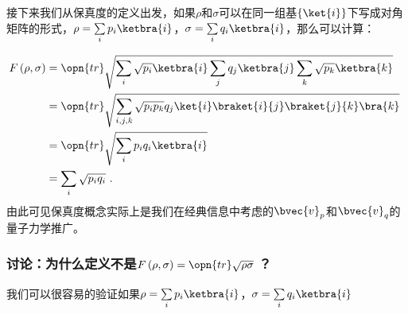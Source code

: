 接下来我们从保真度的定义出发，如果$\rho$和$\sigma$可以在同一组基$\left\{\ket{i}\right\}$下写成对角矩阵的形式，$\rho = \sum\limits_ip_i\ketbra{i}$，$\sigma = \sum\limits_iq_i\ketbra{i}$，那么可以计算：

\begin{equation}
\begin{aligned}
F\left(\rho,\sigma\right) &= \opn{tr}\sqrt{\sum_{i} \sqrt{p_i}\ketbra{i}\sum_{j}q_j\ketbra{j}\sum_k\sqrt{p_k}\ketbra{k}} \\
&= \opn{tr}\sqrt{\sum_{i,j,k}\sqrt{p_ip_k}q_j\ket{i}\braket{i}{j}\braket{j}{k}\bra{k}} \\
&= \opn{tr}\sqrt{\sum_ip_iq_i\ketbra{i}} \\
&= \sum_i\sqrt{p_iq_i}~.
\end{aligned}~
\end{equation}
由此可见保真度概念实际上是我们在经典信息中考虑的$\bvec{v}_p$和$\bvec{v}_q$的量子力学推广。

\subsubsection{讨论：为什么定义不是$F\left(\rho,\sigma\right) = \opn{tr}\sqrt{\rho\sigma}~$？}

我们可以很容易的验证如果$\rho = \sum\limits_i p_i\ketbra{i}$，$\sigma = \sum\limits_i q_i \ketbra{i}$

